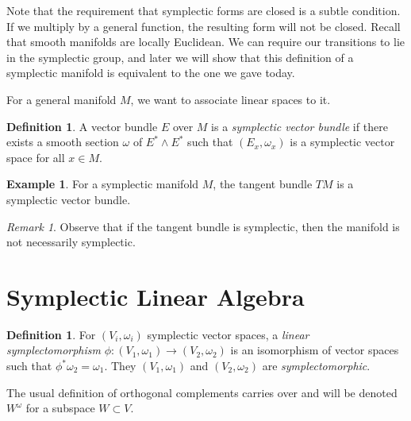 \documentclass[leqno, openany]{memoir}
\theoremstyle{definition}
\newtheorem{defn}[thm]{Definition}
\newtheorem{exm}[thm]{Example}
\theoremstyle{remark}
\newtheorem{rmk}[thm]{Remark}
\theoremstyle{plain}
\theoremstyle{definition}
\theoremstyle{remark}
\begin{document}
Note that the requirement that symplectic forms are closed is a subtle condition. If we multiply by a general function, the resulting form will not be closed. Recall that smooth manifolds are locally Euclidean. We can require our transitions to lie in the symplectic group, and later we will show that this definition of a symplectic manifold is equivalent to the one we gave today.

For a general manifold $M$, we want to associate linear spaces to it. 

\begin{defn}
    A vector bundle $E$ over $M$ is a \textit{symplectic vector bundle} if there exists a smooth section $\omega$ of $E^* \wedge E^*$ such that $(E_x, \omega_x)$ is a symplectic vector space for all $x \in M$.
\end{defn}

\begin{exm}
    For a symplectic manifold $M$, the tangent bundle $TM$ is a symplectic vector bundle.
\end{exm}

\begin{rmk}
    Observe that if the tangent bundle is symplectic, then the manifold is not necessarily symplectic.
\end{rmk}

\section{Symplectic Linear Algebra}%
\label{sec:symplectic_linear_algebra}

\begin{defn}
    For $(V_i, \omega_i)$ symplectic vector spaces, a \textit{linear symplectomorphism} $\phi: (V_1, \omega_1) \to (V_2, \omega_2)$ is an isomorphism of vector spaces such that $\phi^* \omega_2 = \omega_1$. They $(V_1, \omega_1)$ and $(V_2, \omega_2)$ are \textit{symplectomorphic}.
\end{defn}

The usual definition of orthogonal complements carries over and will be denoted $W^{\omega}$ for a subspace $W \subset V$.
\end{document}
